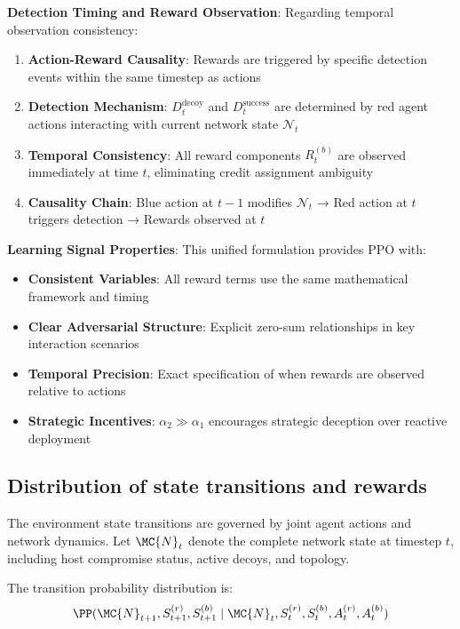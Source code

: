 \documentclass[12pt,oneside]{article}
\begin{document}
\textbf{Detection Timing and Reward Observation}:
Regarding temporal observation consistency:
\begin{enumerate}
\item \textbf{Action-Reward Causality}: Rewards are triggered by specific detection events within the same timestep as actions
\item \textbf{Detection Mechanism}: $D_t^{\text{decoy}}$ and $D_t^{\text{success}}$ are determined by red agent actions interacting with current network state $\mathcal{N}_t$
\item \textbf{Temporal Consistency}: All reward components $R_t^{(b)}$ are observed immediately at time $t$, eliminating credit assignment ambiguity
\item \textbf{Causality Chain}: Blue action at $t-1$ modifies $\mathcal{N}_t$ → Red action at $t$ triggers detection → Rewards observed at $t$
\end{enumerate}

\textbf{Learning Signal Properties}:
This unified formulation provides PPO with:
\begin{itemize}
\item \textbf{Consistent Variables}: All reward terms use the same mathematical framework and timing
\item \textbf{Clear Adversarial Structure}: Explicit zero-sum relationships in key interaction scenarios
\item \textbf{Temporal Precision}: Exact specification of when rewards are observed relative to actions
\item \textbf{Strategic Incentives}: $\alpha_2 \gg \alpha_1$ encourages strategic deception over reactive deployment
\end{itemize}

\subsection{Distribution of state transitions and rewards}

The environment state transitions are governed by joint agent actions and network dynamics. Let $\MC{N}_t$ denote the complete network state at timestep $t$, including host compromise status, active decoys, and topology.

The transition probability distribution is:
\begin{equation}
\PP(\MC{N}_{t+1}, S_{t+1}^{(r)}, S_{t+1}^{(b)} \mid \MC{N}_t, S_t^{(r)}, S_t^{(b)}, A_t^{(r)}, A_t^{(b)})
\end{equation}
\end{document}
